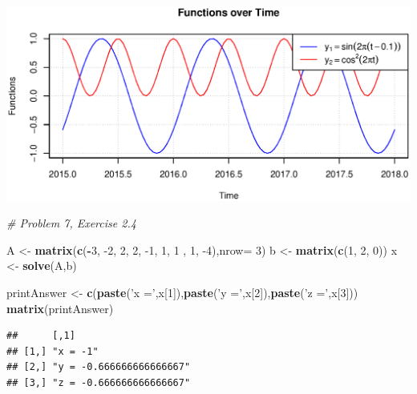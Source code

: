 \documentclass[
]{article}
\newenvironment{Shaded}{\begin{snugshade}}{\end{snugshade}}
\newcommand{\CommentTok}[1]{\textcolor[rgb]{0.56,0.35,0.01}{\textit{#1}}}
\newcommand{\DataTypeTok}[1]{\textcolor[rgb]{0.13,0.29,0.53}{#1}}
\newcommand{\DecValTok}[1]{\textcolor[rgb]{0.00,0.00,0.81}{#1}}
\newcommand{\KeywordTok}[1]{\textcolor[rgb]{0.13,0.29,0.53}{\textbf{#1}}}
\newcommand{\NormalTok}[1]{#1}
\newcommand{\OperatorTok}[1]{\textcolor[rgb]{0.81,0.36,0.00}{\textbf{#1}}}
\newcommand{\StringTok}[1]{\textcolor[rgb]{0.31,0.60,0.02}{#1}}
\begin{document}
\includegraphics{Figures/prob6}
\newpage
\begin{Shaded}
\begin{Highlighting}[]
\CommentTok{# Problem 7, Exercise 2.4}

\NormalTok{A <-}\StringTok{ }\KeywordTok{matrix}\NormalTok{(}\KeywordTok{c}\NormalTok{(}\OperatorTok{-}\DecValTok{3}\NormalTok{, }\DecValTok{-2}\NormalTok{, }\DecValTok{2}\NormalTok{, }\DecValTok{2}\NormalTok{, }\DecValTok{-1}\NormalTok{, }\DecValTok{1}\NormalTok{, }\DecValTok{1}\NormalTok{ , }\DecValTok{1}\NormalTok{, }\DecValTok{-4}\NormalTok{),}\DataTypeTok{nrow=} \DecValTok{3}\NormalTok{)}
\NormalTok{b <-}\StringTok{ }\KeywordTok{matrix}\NormalTok{(}\KeywordTok{c}\NormalTok{(}\DecValTok{1}\NormalTok{, }\DecValTok{2}\NormalTok{, }\DecValTok{0}\NormalTok{))}
\NormalTok{x <-}\StringTok{ }\KeywordTok{solve}\NormalTok{(A,b)}

\NormalTok{printAnswer <-}\StringTok{ }\KeywordTok{c}\NormalTok{(}\KeywordTok{paste}\NormalTok{(}\StringTok{'x ='}\NormalTok{,x[}\DecValTok{1}\NormalTok{]),}\KeywordTok{paste}\NormalTok{(}\StringTok{'y ='}\NormalTok{,x[}\DecValTok{2}\NormalTok{]),}\KeywordTok{paste}\NormalTok{(}\StringTok{'z ='}\NormalTok{,x[}\DecValTok{3}\NormalTok{]))}
\KeywordTok{matrix}\NormalTok{(printAnswer)}
\end{Highlighting}
\end{Shaded}

\begin{verbatim}
##      [,1]                    
## [1,] "x = -1"                
## [2,] "y = -0.666666666666667"
## [3,] "z = -0.666666666666667"
\end{verbatim}
\end{document}
